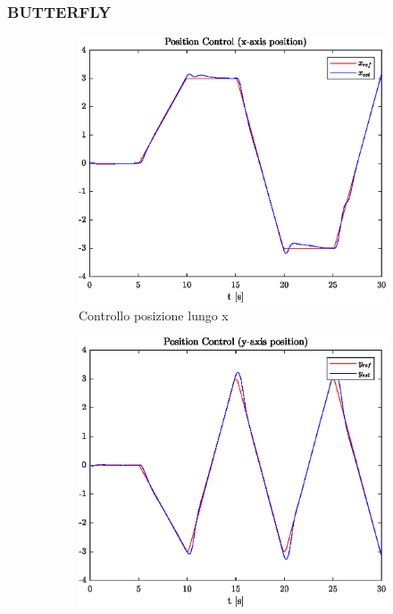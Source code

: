 \clearpage
\subsubsection{BUTTERFLY}

\begin{figure}
	\centering
	\begin{subfigure}{0.45\textwidth}
		\centering
		\includegraphics[width=1\textwidth]{Simulazioni/Figure/SMC/BUTTERFLY/PositionControlXPos}
		\caption{Controllo posizione lungo x}
	\end{subfigure}
	\hfill
	\begin{subfigure}{0.45\textwidth}
		\centering
		\includegraphics[width=1\textwidth]{Simulazioni/Figure/SMC/BUTTERFLY/PositionControlYPos}

\end{subfigure}
\end{figure}
